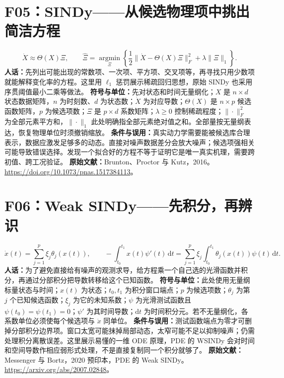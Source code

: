 \documentclass[UTF8,zihao=-4,openany,oneside,fontset=windows]{ctexbook}
\begin{document}
\section{F05：SINDy——从候选物理项中挑出简洁方程}
\begin{equation}
 \dot X\approx\Theta(X)\Xi,\qquad
 \hat\Xi=\underset{\Xi}{\operatorname{argmin}}
 \left\{\frac12\|\dot X-\Theta(X)\Xi\|_F^2+\lambda\|\Xi\|_1\right\}.
\end{equation}
\textbf{人话：}先列出可能出现的常数项、一次项、平方项、交叉项等，再寻找只用少数项就能解释变化率的方程。这里用 $\ell_1$ 惩罚展示稀疏回归思想，原始 SINDy 也采用序贯阈值最小二乘等做法。
\textbf{符号与单位：}先对状态和时间无量纲化；$X$ 是 $n\times d$ 状态数据矩阵，$n$ 为时刻数、$d$ 为状态数；$\dot X$ 为对应导数；$\Theta(X)$ 是 $n\times p$ 候选函数矩阵，$p$ 为候选项数；$\Xi$ 是 $p\times d$ 系数矩阵；$\lambda\ge0$ 控制稀疏程度；$\|\cdot\|_F^2$ 为全部元素平方和，$\|\cdot\|_1$ 此处明确指全部元素绝对值之和。全部量按无量纲表达，恢复物理单位时须撤销缩放。
\textbf{条件与误用：}真实动力学需要能被候选库合理表示，数据应激发足够多的动态。直接对噪声数据差分会放大噪声；候选项强相关可能导致错误选择。发现一个拟合好的方程不等于证明它是唯一真实机理，需要跨初值、跨工况验证。
\textbf{原始文献：}Brunton、Proctor 与 Kutz，2016。\url{https://doi.org/10.1073/pnas.1517384113}。

\section{F06：Weak SINDy——先积分，再辨识}
\begin{equation}
 \dot x(t)=\sum_{j=1}^{p}\xi_j\theta_j(x(t)),\qquad
 -\int_{t_0}^{t_1}x(t)\psi'(t)\,\mathrm dt
 =\sum_{j=1}^{p}\xi_j\int_{t_0}^{t_1}\theta_j(x(t))\psi(t)\,\mathrm dt.
\end{equation}
\textbf{人话：}为了避免直接给有噪声的观测求导，给方程乘一个自己选的光滑函数并积分，再通过分部积分把导数转移给这个已知函数。
\textbf{符号与单位：}此处使用无量纲标量状态与时间；$x(t)$ 为状态；$t_0,t_1$ 为积分窗口端点；$p$ 为候选项数；$\theta_j$ 为第 $j$ 个已知候选函数；$\xi_j$ 为它的未知系数；$\psi$ 为光滑测试函数且 $\psi(t_0)=\psi(t_1)=0$；$\psi'$ 为其时间导数；$\mathrm dt$ 为时间积分元。若不无量纲化，各系数单位必须使每个候选项与 $\dot x$ 同单位。
\textbf{条件与误用：}测试函数端点为零才可删掉分部积分边界项。窗口太宽可能抹掉局部动态，太窄可能不足以抑制噪声；仍需处理积分离散误差。这里展示易懂的一维 ODE 原理，PDE 的 WSINDy 会对时间和空间导数作相应弱形式处理，不是直接复制同一个积分就够了。
\textbf{原始文献：}Messenger 与 Bortz，2020 预印本，PDE 的 Weak SINDy。\url{https://arxiv.org/abs/2007.02848}。
\end{document}
